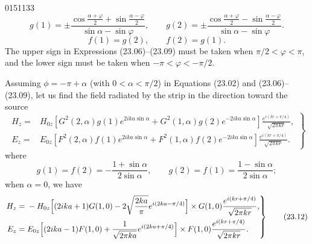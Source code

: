 \begin{scanpage}{0151}{133}
\[
g(1)=\pm\frac{\cos\frac{\alpha+\varphi}{2}+\sin\frac{\alpha-\varphi}{2}}{\sin\alpha-\sin\varphi},\qquad g(2)=\pm\frac{\cos\frac{\alpha+\varphi}{2}-\sin\frac{\alpha-\varphi}{2}}{\sin\alpha-\sin\varphi}.\tag{23.08}
\]
\[
f(1)=g(2),\qquad f(2)=g(1).\tag{23.09}
\]
The upper sign in Expressions (23.06)--(23.09) must be taken when $\pi/2<\varphi<\pi$, and the lower sign must be taken when $-\pi<\varphi<-\pi/2$.

Assuming $\phi=-\pi+\alpha$ (with $0<\alpha<\pi/2$) in Equations (23.02) and (23.06)--(23.09), let us find the field radiated by the strip in the direction toward the source
\[
\left.\begin{aligned}H_z={}&H_{0z}[G^2(2,\alpha)g(1)e^{2ika\sin\alpha}+G^2(1,\alpha)g(2)e^{-2ika\sin\alpha}]\frac{e^{i(kr+\pi/4)}}{\sqrt{2\pi kr}},\\
E_z={}&E_{0z}[F^2(2,\alpha)f(1)e^{2ika\sin\alpha}+F^2(1,\alpha)f(2)e^{-2ika\sin\alpha}]\frac{e^{i(kr+\pi/4)}}{\sqrt{2\pi kr}}.
\end{aligned}\right\}\tag{23.10}
\]
where
\[
g(1)=f(2)=-\frac{1+\sin\alpha}{2\sin\alpha},\qquad g(2)=f(1)=\frac{1-\sin\alpha}{2\sin\alpha};\tag{23.11}
\]
when $\alpha=0$, we have
\[
\left.\begin{aligned}H_z={}&-H_{0z}\Bigl[(2ika+1)G(1,0)-2\sqrt{\frac{2ka}{\pi}}e^{i(2ka-\pi/4)}\Bigr]\times G(1,0)\frac{e^{i(kr+\pi/4)}}{\sqrt{2\pi kr}},\\
E_z={}&E_{0z}\Bigl[(2ika-1)F(1,0)+\frac1{\sqrt{2\pi ka}}e^{i(2ka+\pi/4)}\Bigr]\times F(1,0)\frac{e^{i(kr+\pi/4)}}{\sqrt{2\pi kr}}.
\end{aligned}\right\}\tag{23.12}
\]
\end{scanpage}
